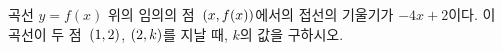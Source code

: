 곡선 $y=f(x)$ 위의 임의의 점~$(x{,}\mkern3mu\mathopen{}f(x))$에서의 접선의 기울기가 $-4x+2$이다. 이 곡선이 두 점~$(1{,}\mkern3mu\mathopen{}2)$, $(2{,}\mkern3mu\mathopen{}k)$를 지날 때, $k$의 값을 구하시오.
